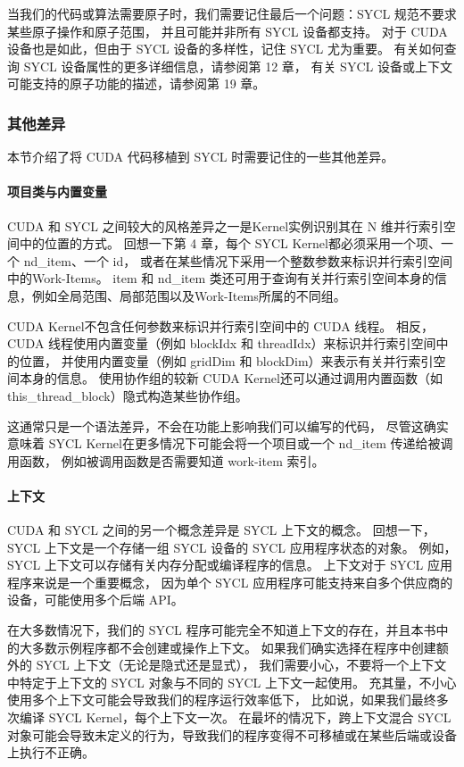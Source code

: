 当我们的代码或算法需要原子时，我们需要记住最后一个问题：SYCL 规范不要求某些原子操作和原子范围，
并且可能并非所有 SYCL 设备都支持。 对于 CUDA 设备也是如此，但由于 SYCL 设备的多样性，记住 SYCL 尤为重要。 
有关如何查询 SYCL 设备属性的更多详细信息，请参阅第 12 章，
有关 SYCL 设备或上下文可能支持的原子功能的描述，请参阅第 19 章。

\subsubsection{其他差异}
本节介绍了将 CUDA 代码移植到 SYCL 时需要记住的一些其他差异。

\paragraph{项目类与内置变量}

CUDA 和 SYCL 之间较大的风格差异之一是Kernel实例识别其在 N 维并行索引空间中的位置的方式。 
回想一下第 4 章，每个 SYCL Kernel都必须采用一个项、一个 nd\_item、一个 id，
或者在某些情况下采用一个整数参数来标识并行索引空间中的Work-Items。 
item 和 nd\_item 类还可用于查询有关并行索引空间本身的信息，例如全局范围、局部范围以及Work-Items所属的不同组。

CUDA Kernel不包含任何参数来标识并行索引空间中的 CUDA 线程。 
相反，CUDA 线程使用内置变量（例如 blockIdx 和 threadIdx）来标识并行索引空间中的位置，
并使用内置变量（例如 gridDim 和 blockDim）来表示有关并行索引空间本身的信息。 
使用协作组的较新 CUDA Kernel还可以通过调用内置函数（如 this\_thread\_block）隐式构造某些协作组。

这通常只是一个语法差异，不会在功能上影响我们可以编写的代码，
尽管这确实意味着 SYCL Kernel在更多情况下可能会将一个项目或一个 nd\_item 传递给被调用函数，
例如被调用函数是否需要知道 work-item 索引。

\paragraph{上下文}

CUDA 和 SYCL 之间的另一个概念差异是 SYCL 上下文的概念。 
回想一下，SYCL 上下文是一个存储一组 SYCL 设备的 SYCL 应用程序状态的对象。 
例如，SYCL 上下文可以存储有关内存分配或编译程序的信息。 上下文对于 SYCL 应用程序来说是一个重要概念，
因为单个 SYCL 应用程序可能支持来自多个供应商的设备，可能使用多个后端 API。

在大多数情况下，我们的 SYCL 程序可能完全不知道上下文的存在，并且本书中的大多数示例程序都不会创建或操作上下文。 
如果我们确实选择在程序中创建额外的 SYCL 上下文（无论是隐式还是显式），
我们需要小心，不要将一个上下文中特定于上下文的 SYCL 对象与不同的 SYCL 上下文一起使用。 
充其量，不小心使用多个上下文可能会导致我们的程序运行效率低下，
比如说，如果我们最终多次编译 SYCL Kernel，每个上下文一次。 
在最坏的情况下，跨上下文混合 SYCL 对象可能会导致未定义的行为，导致我们的程序变得不可移植或在某些后端或设备上执行不正确。


